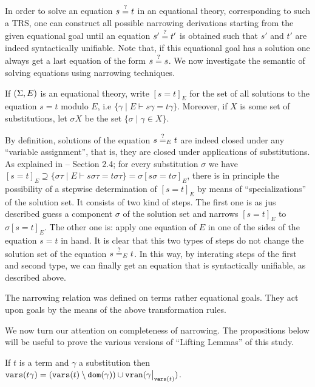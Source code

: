 In order to solve an equation $s\overset{?}{=}t$ in an equational theory, corresponding to such a TRS, one can construct all possible narrowing derivations starting from the given equational goal until an equation $s'\overset{?}{=}t'$ is obtained such that $s'$ and $t'$ are indeed syntactically unifiable. Note that, if this equational goal has a solution one always get a last equation of the form $s\overset{?}{=}s$. We now investigate the semantic of solving equations using narrowing techniques.

If $(\Sigma, E)$ is an equational theory, write $[s = t]_E$ for the set of all solutions to the equation $s = t$ modulo $E$, i.e $\{\gamma \mid E \vdash s\gamma = t \gamma \}$. Moreover, if $X$ is some set of substitutions, let $\sigma X$ be the set $\{ \sigma \mid \gamma \in X \}$.

By definition, solutions of the equation $s \eqUnif{E}{?}t$ are indeed closed under any ``variable assignment'', that is, they are closed under applications of substitutions. As explained in \cite{10.1007/BFb0032044} -- Section 2.4; for every substitution $\sigma$ we have $[s = t]_E \supseteq \{ \sigma \tau \mid E \vdash s\sigma \tau = t \sigma \tau  \} = \sigma [s\sigma = t \sigma]_E$, there is in principle the possibility of a stepwise determination of $[s = t]_E$ by means of ``specializations'' of the solution set. It consists of two kind of steps. The first one is as jus described guess a component $\sigma$ of the solution set and narrows $[s = t ]_E$ to $\sigma[s = t]_E$. The other one is: apply one equation of $E$ in one of the sides of the equation $s = t$ in hand. It is clear that this two types of steps do not change the solution set of the equation $s \eqUnif{E}{?} t$. In this way, by interating steps of the first and second type, we can finally get an equation that is syntactically unifiable, as described above.

The narrowing relation was defined on terms rather equational goals. They act upon goals by the means of the above transformation rules.

We now turn our attention on completeness of narrowing. The propositions below will be useful to prove the various versions of ``Lifting Lemmas'' of this study.

\begin{proposition}\label{proposition:varst}
	If $t$ is a term and $\gamma$ a substitution then $\vars{t\gamma} = (\vars{t} \setminus \dom{\gamma}) \cup \vran{\restr{\gamma}{\vars{t}}}$.
\end{proposition}

